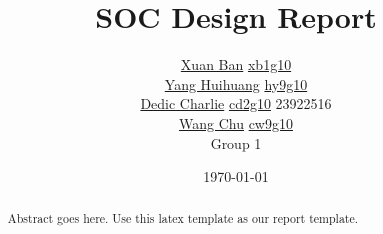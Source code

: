 \documentclass{IEEEtran}			 %
\begin{document}
\title      {SOC Design Report}
\author    {

\texorpdfstring {\href{mailto:xb1g10@ecs.soton.ac.uk}{Xuan Ban}} {Xuan Ban}  
\texorpdfstring {\href{mailto:xb1g10@ecs.soton.ac.uk}{xb1g10}} {xb1g10} \\ 
    {\href{mailto:xb1g10@ecs.soton.ac.uk}{Yang Huihuang}} 
	\texorpdfstring  {\href{mailto:hy9g10@ecs.soton.ac.uk}{hy9g10}} {hy9g10} \\   
    {\href{mailto:xb1g10@ecs.soton.ac.uk}{Dedic Charlie}} 
	\texorpdfstring  {\href{mailto:cd2g11@ecs.soton.ac.uk}{cd2g10}} {cd2g11} {23922516} \\
    {\href{mailto:xb1g10@ecs.soton.ac.uk}{Wang Chu}}             
	\texorpdfstring  {\href{mailto:cd2g10@ecs.soton.ac.uk}{cw9g10}} {cw9g10} \\
	Group 1
            }
\date       {\today}

\maketitle

\begin{abstract}
Abstract goes here. Use this latex template as our report template.
\end{abstract}
















%
%
%
%
%
\end{document}
